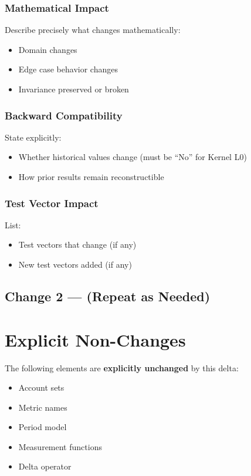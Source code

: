 \documentclass[11pt]{article}
\begin{document}
\subsubsection*{Mathematical Impact}
Describe precisely what changes mathematically:
\begin{itemize}
  \item Domain changes
  \item Edge case behavior changes
  \item Invariance preserved or broken
\end{itemize}

\subsubsection*{Backward Compatibility}
State explicitly:
\begin{itemize}
  \item Whether historical values change (must be ``No'' for Kernel L0)
  \item How prior results remain reconstructible
\end{itemize}

\subsubsection*{Test Vector Impact}
List:
\begin{itemize}
  \item Test vectors that change (if any)
  \item New test vectors added (if any)
\end{itemize}

\subsection{Change 2 — (Repeat as Needed)}

\section{Explicit Non-Changes}

The following elements are \textbf{explicitly unchanged} by this delta:

\begin{itemize}
  \item Account sets
  \item Metric names
  \item Period model
  \item Measurement functions
  \item Delta operator
\end{itemize}
\end{document}
